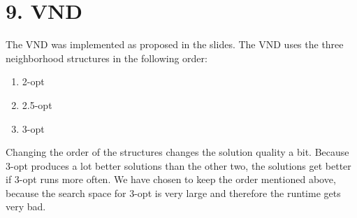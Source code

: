 \section*{9. VND}
The VND was implemented as proposed in the slides. The VND uses the three neighborhood structures in the following order:
\begin{enumerate}
  \item 2-opt
  \item 2.5-opt
  \item 3-opt
\end{enumerate}
Changing the order of the structures changes the solution quality a bit. Because 3-opt produces a lot better solutions than the other two, the solutions get better if 3-opt runs more often. We have chosen to keep the order mentioned above, because the search space for 3-opt is very large and therefore the runtime gets very bad.

